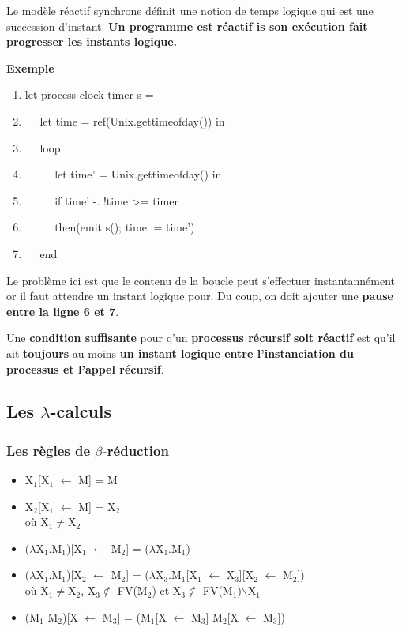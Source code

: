 \documentclass[10pt,a4paper]{article}
\begin{document}
				Le mod\`{e}le r\'{e}actif synchrone d\'{e}finit une notion de temps logique qui est une succession d'instant.
				\smallbreak
				\textbf{
					Un programme est r\'{e}actif is son ex\'{e}cution fait progresser les instants logique.
				}
				\medbreak
				
				\textbf{Exemple}
				\medbreak
				
				\begin{enumerate}
				 	\item let process clock timer s =
				 	\item $\quad$ let time = ref(Unix.gettimeofday()) in
				 	\item $\quad$ loop
				 	\item $\quad$ $\quad$ let time' = Unix.gettimeofday() in
				 	\item $\quad$ $\quad$ if time' -. !time >= timer
				 	\item $\quad$ $\quad$ then(emit s(); time := time')
				 	\item $\quad$ end 
				\end{enumerate}
				\medbreak
				
				Le probl\`{e}me ici est que le contenu de la boucle peut s'effectuer instantann\'{e}ment or il faut attendre un instant logique pour. Du coup, on doit ajouter une \textbf{pause entre la ligne 6 et 7}.
				\bigbreak
				
				Une \textbf{condition suffisante} pour q'un \textbf{processus r\'{e}cursif soit r\'{e}actif} est qu'il ait \textbf{toujours} au moins \textbf{un instant logique entre l'instanciation du processus et l'appel r\'{e}cursif}.
				
				
		
			\newpage
			
			\subsection{Les  $\lambda$-calculs}
				
				\subsubsection{Les règles de $\beta$-réduction}
					\begin{itemize}
						\item X$_{1}$[X$_{1}$ $\leftarrow$ M] = M
						\item X$_{2}$[X$_{1}$ $\leftarrow$ M] = X$_{2}$ 
						\\où X$_{1}$$\neq$X$_{2}$
						\item ($\lambda$X$_{1}$.M$_{1}$)[X$_{1}$ $\leftarrow$ M$_{2}$] =  ($\lambda$X$_{1}$.M$_{1}$)
						\item ($\lambda$X$_{1}$.M$_{1}$)[X$_{2}$ $\leftarrow$ M$_{2}$] = ($\lambda$X$_{3}$.M$_{1}$[X$_{1}$ $\leftarrow$ X$_{3}$][X$_{2}$ $\leftarrow$ M$_{2}$]) 
						\\où X$_{1}$$\neq$X$_{2}$, X$_{3}$$\notin$ FV(M$_{2}$) 
						et X$_{3}$$\notin$ FV(M$_{1}$)$\backslash${X$_{1}$} 
						\item (M$_{1}$ M$_{2}$)[X $\leftarrow$ M$_{3}$] = 
						(M$_{1}$[X $\leftarrow$ M$_{3}$] M$_{2}$[X $\leftarrow$ M$_{3}$])
					\end{itemize}
			
\end{document}
